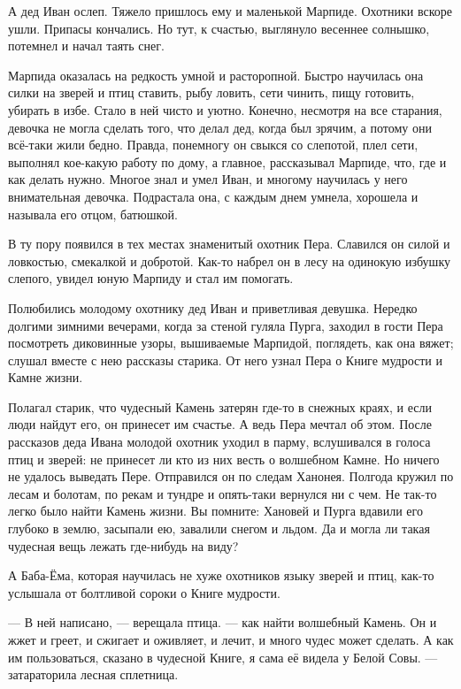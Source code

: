\documentclass[12pt, a4paper, openany]{book}
\begin{document}
	А дед Иван ослеп. Тяжело пришлось ему и маленькой Марпиде. Охотники вскоре ушли. Припасы кончались. Но тут, к счастью, выглянуло весеннее солнышко, потемнел и начал таять снег.
	
	Марпида оказалась на редкость умной и расторопной. Быстро научилась она силки на зверей и птиц ставить, рыбу ловить, сети чинить, пищу готовить, убирать в избе. Стало в ней чисто и уютно. Конечно, несмотря на все старания, девочка не могла сделать того, что делал дед, когда был зрячим, а потому они всё-таки жили бедно. Правда, понемногу он свыкся со слепотой, плел сети, выполнял кое-какую работу по дому, а главное, рассказывал Марпиде, что, где и как делать нужно. Многое знал и умел Иван, и многому научилась у него внимательная девочка. Подрастала она, с каждым днем умнела, хорошела и называла его отцом, батюшкой.
	
	В ту пору появился в тех местах знаменитый охотник Пера. Славился он силой и ловкостью, смекалкой и добротой. Как-то набрел он в лесу на одинокую избушку слепого, увидел юную Марпиду и стал им помогать.
	
	Полюбились молодому охотнику дед Иван и приветливая девушка. Нередко долгими зимними вечерами, когда за стеной гуляла Пурга, заходил в гости Пера посмотреть диковинные узоры, вышиваемые Марпидой, поглядеть, как она вяжет; слушал вместе с нею рассказы старика. От него узнал Пера о Книге мудрости и Камне жизни.
	
	Полагал старик, что чудесный Камень затерян где-то в снежных краях, и если люди найдут его, он принесет им счастье. А ведь Пера мечтал об этом. После рассказов деда Ивана молодой охотник уходил в парму, вслушивался в голоса птиц и зверей: не принесет ли кто из них весть о волшебном Камне. Но ничего не удалось выведать Пере. Отправился он по следам Ханонея. Полгода кружил по лесам и болотам, по рекам и тундре и опять-таки вернулся ни с чем. Не так-то легко было найти Камень жизни. Вы помните: Хановей и Пурга вдавили его глубоко в землю, засыпали ею, завалили снегом и льдом. Да и могла ли такая чудесная вещь лежать где-нибудь на виду?
	
	А Баба-Ёма, которая научилась не хуже охотников языку зверей и птиц, как-то услышала от болтливой сороки о Книге мудрости.
	
	— В ней написано, — верещала птица. — как найти волшебный Камень. Он и жжет и греет, и сжигает и оживляет, и лечит, и много чудес может сделать. А как им пользоваться, сказано в чудесной Книге, я сама её видела у Белой Совы. — затараторила лесная сплетница.
	
\end{document}

